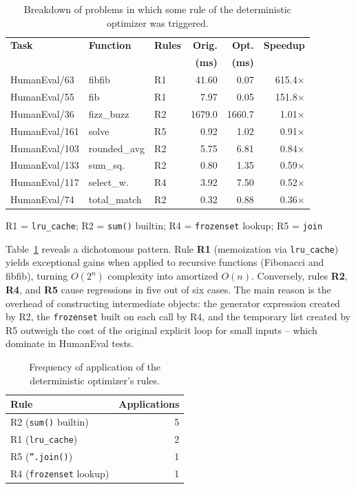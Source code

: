 \documentclass[conference]{IEEEtran}
\begin{document}
\begin{table}[htbp]
\caption{Breakdown of problems in which some rule of the deterministic optimizer was triggered.}
\label{tab:detalhe}
\centering
\footnotesize
\begin{tabular}{lllrrr}
\hline
\textbf{Task} & \textbf{Function} & \textbf{Rules} & \textbf{Orig.} & \textbf{Opt.} & \textbf{Speedup} \\
 & & & \textbf{(ms)} & \textbf{(ms)} & \\
\hline
HumanEval/63 & fibfib & R1 & 41.60 & 0.07 & 615.4$\times$ \\
HumanEval/55 & fib & R1 & 7.97 & 0.05 & 151.8$\times$ \\
HumanEval/36 & fizz\_buzz & R2 & 1679.0 & 1660.7 & 1.01$\times$ \\
HumanEval/161 & solve & R5 & 0.92 & 1.02 & 0.91$\times$ \\
HumanEval/103 & rounded\_avg & R2 & 5.75 & 6.81 & 0.84$\times$ \\
HumanEval/133 & sum\_sq. & R2 & 0.80 & 1.35 & 0.59$\times$ \\
HumanEval/117 & select\_w. & R4 & 3.92 & 7.50 & 0.52$\times$ \\
HumanEval/74 & total\_match & R2 & 0.32 & 0.88 & 0.36$\times$ \\
\hline
\end{tabular}
\vspace{0.1cm}
\raggedright
\scriptsize R1 = \texttt{lru\_cache}; R2 = \texttt{sum()} builtin; R4 = \texttt{frozenset} lookup; R5 = \texttt{join}
\end{table}

Table~\ref{tab:detalhe} reveals a dichotomous pattern. Rule \textbf{R1} (memoization via \texttt{lru\_cache}) yields exceptional gains when applied to recursive functions (Fibonacci and fibfib), turning $O(2^n)$ complexity into amortized $O(n)$. Conversely, rules \textbf{R2}, \textbf{R4}, and \textbf{R5} cause regressions in five out of six cases. The main reason is the overhead of constructing intermediate objects: the generator expression created by R2, the \texttt{frozenset} built on each call by R4, and the temporary list created by R5 outweigh the cost of the original explicit loop for small inputs -- which dominate in HumanEval tests.

\begin{table}[htbp]
\caption{Frequency of application of the deterministic optimizer's rules.}
\label{tab:regras}
\centering
\begin{tabular}{lr}
\hline
\textbf{Rule} & \textbf{Applications} \\
\hline
R2 (\texttt{sum()} builtin) & 5 \\
R1 (\texttt{lru\_cache}) & 2 \\
R5 (\texttt{''.join()}) & 1 \\
R4 (\texttt{frozenset} lookup) & 1 \\
\hline
\end{tabular}
\end{table}
\end{document}
